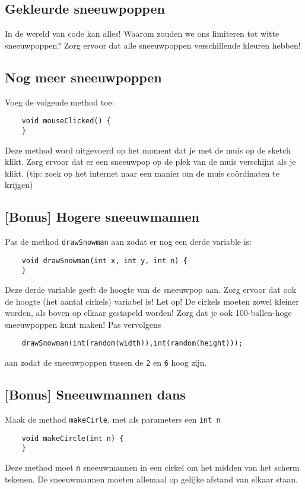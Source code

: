 \subsection{Gekleurde sneeuwpoppen}
In de wereld van code kan alles! Waarom zouden we ons limiteren tot witte sneeuwpoppen?
Zorg ervoor dat alle sneeuwpoppen verschillende kleuren hebben!
\subsection{Nog meer sneeuwpoppen}
Voeg de volgende method toe:
\begin{lstlisting}
    void mouseClicked() {
    }
\end{lstlisting}
Deze method word uitgevoerd op het moment dat je met de muis op de sketch klikt. Zorg ervoor dat er een sneeuwpop op de plek van de muis verschijnt als je klikt. (tip: zoek op het internet naar een manier om de muis co\"ordinaten te krijgen)
\subsection{[Bonus] Hogere sneeuwmannen}
Pas de method \texttt{drawSnowman} aan zodat er nog een derde variable is:
\begin{lstlisting}
    void drawSnowman(int x, int y, int n) {
    }
\end{lstlisting}
Deze derde variable geeft de hoogte van de sneeuwpop aan. Zorg ervoor dat ook de hoogte (het aantal cirkels) variabel is! Let op! De cirkels moeten zowel kleiner worden, als boven op elkaar gestapeld worden! Zorg dat je ook 100-ballen-hoge sneeuwpoppen kunt maken! Pas vervolgens 
\begin{lstlisting}
    drawSnowman(int(random(width)),int(random(height)));
\end{lstlisting}
aan zodat de sneeuwpoppen tussen de \texttt{2} en \texttt{6} hoog zijn.
\subsection{[Bonus] Sneeuwmannen dans}
Maak de method \texttt{makeCirle}, met als parameters een \texttt{int n}
\begin{lstlisting}
    void makeCircle(int n) {
    }
\end{lstlisting}
Deze method moet \texttt{n} sneeuwmannen in een cirkel om het midden van het scherm tekenen. De sneeuwmannen moeten allemaal op gelijke afstand van elkaar staan.


